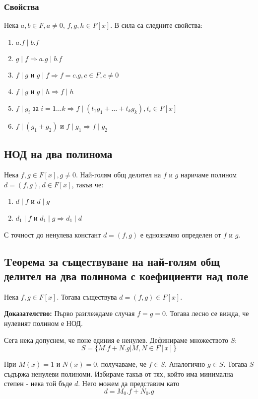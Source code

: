 \documentclass[fleqn,12pt]{article}
\begin{document}
\subsubsection{Свойства}
Нека $a,b \in F, a \neq 0$, $f,g,h \in F[x]$. В сила са следните свойства:
\begin{enumerate}
    \item $a.f \mid b.f$
    \item $g \mid f \Rightarrow a.g \mid b.f$
    \item \label{div_prop:mutual_div} $f \mid g$ и $g \mid f \Rightarrow f = c.g, c \in F, c\neq 0$
    \item $f \mid g$ и $g \mid h \Rightarrow f \mid h$
    \item $f \mid g_i$ за $i = 1 \dots k \Rightarrow f \mid (t_1 g_1 + \dots + t_k g_k), t_i \in F[x]$
    \item \label{div_prop:sum} $f \mid (g_1 + g_2)$ и $f \mid g_1 \Rightarrow f \mid g_2$ 
\end{enumerate} 

\subsection{НОД на два полинома}
Нека $f,g \in F[x], g \neq 0$. Най-голям общ делител на $f$ и $g$ наричаме 
полином $d = (f,g), d \in F[x]$, такъв че:
\begin{enumerate}
    \item $d \mid f$ и $d \mid g$
    \item $d_1 \mid f$ и $d_1 \mid g \Rightarrow d_1 \mid d$
\end{enumerate}

С точност до ненулева констант $d=(f,g)$ е еднозначно определен от $f$ и $g$.

\subsection{Tеорема за съществуване на най-голям общ делител на два полинома с коефициенти над поле}
\label{sec:gcd_exist}
Нека $f,g \in F[x]$. Тогава съществува $d=(f,g) \in F[x]$.

\textbf{Доказателство: } Първо разглеждаме случая $f = g = 0$. Тогава лесно се вижда, че нулевият полином е НОД.

Сега нека допуснем, че поне единия е ненулев. Дефинираме множеството $S$:
\[ S = \{ M.f + N.g | M,N \in F[x] \} \]

При $M(x) = 1$ и $N(x) = 0$, получаваме, че $f \in S$. Аналогично $g \in S$. 
Тогава $S$ съдържа ненулеви полиноми. Избираме такъв от тях, който има минимална степен
 - нека той бъде $d$. Него можем да представим като
\[ d = M_0.f + N_0.g \]
\end{document}
